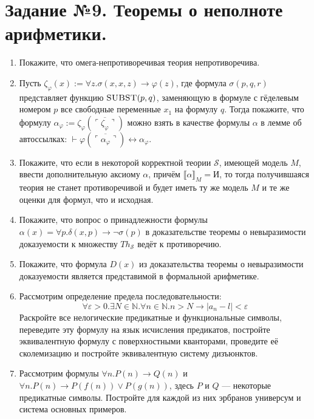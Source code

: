 \documentclass[10pt,a4paper,oneside]{article}
\begin{document}
\section*{Задание №9. Теоремы о неполноте арифметики.}
\begin{enumerate}
\item Покажите, что омега-непротиворечивая теория непротиворечива.
\item Пусть $\zeta_\varphi(x) := \forall z.\sigma (x,x,z) \rightarrow \varphi(z)$,
где формула $\sigma(p,q,r)$ представляет функцию $\textsc{SUBST}(p,q)$, заменяющую в формуле с гёделевым номером $p$
все свободные переменные $x_1$ на формулу $q$. Тогда покажите, что формулу $\alpha_\varphi := \zeta_\varphi(\overline{\ulcorner\zeta_\varphi\urcorner})$
можно взять в качестве формулы $\alpha$ в лемме об автоссылках: $\vdash \varphi(\overline{\ulcorner\alpha_\varphi\urcorner}) \leftrightarrow \alpha_\varphi$.

\item Покажите, что если в некоторой корректной теории $\mathcal{S}$, имеющей модель $M$, ввести дополнительную аксиому $\alpha$, 
причём $\llbracket \alpha \rrbracket_M = \text{И}$, то тогда получившаяся теория не станет противоречивой и 
будет иметь ту же модель $M$ и те же оценки для формул, что и исходная.

\item Покажите, что вопрос о принадлежности формулы $\alpha(x) = \forall p.\delta(x,p) \rightarrow \neg \sigma(p)$ в доказательстве 
теоремы о невыразимости доказуемости к множеству $Th_\mathcal{S}$ ведёт к противоречию.
\item Покажите, что формула $D(x)$ из доказательства теоремы о невыразимости доказуемости является представимой в формальной арифметике.

\item Рассмотрим определение предела последовательности: $$\forall \varepsilon > 0.\exists N \in \mathbb{N}.\forall n\in\mathbb{N}. n > N \rightarrow |a_n-l| < \varepsilon$$
Раскройте все нелогические предикатные и функциональные символы, переведите эту формулу на язык исчисления предикатов, 
постройте эквивалентную формулу с поверхностными кванторами, проведите её сколемизацию
и постройте эквивалентную систему дизъюнктов.

\item Рассмотрим формулы $\forall n.P(n)\rightarrow Q(n)$ и $\forall n.P(n)\rightarrow P(f(n)) \vee P(g(n))$, здесь $P$ и $Q$ --- некоторые предикатные
символы. Постройте для каждой из них эрбранов универсум и система основных примеров.


\end{enumerate}
\end{document}
